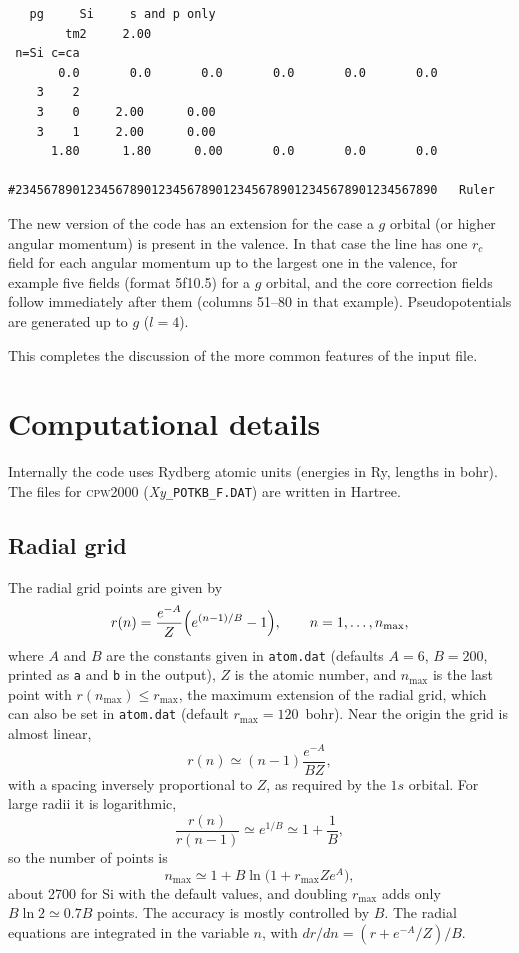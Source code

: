\documentclass[11pt]{article}
\begin{document}
\begin{verbatim}
   pg     Si     s and p only
        tm2     2.00
 n=Si c=ca
       0.0       0.0       0.0       0.0       0.0       0.0
    3    2
    3    0     2.00      0.00
    3    1     2.00      0.00
      1.80      1.80      0.00       0.0       0.0       0.0

#23456789012345678901234567890123456789012345678901234567890   Ruler
\end{verbatim}

The new version of the code has an extension for the case a $g$ orbital
(or higher angular momentum) is present
in the valence.  In that case the line has one $r_c$ field for each angular momentum
up to the largest one in the valence, for example five fields (format 5f10.5) for a $g$
orbital, and the core correction fields follow immediately after them
(columns 51--80 in that example).
Pseudopotentials are generated up to $g$ ($l = 4$).

This completes the discussion of the more common features of the input
file.

\section{Computational details}

Internally the code uses Rydberg atomic units (energies in Ry, lengths in bohr).
The files for \textsc{cpw2000} (\textit{Xy}\texttt{\_POTKB\_F.DAT}) are written in Hartree.

\subsection{Radial grid}
\label{sec:radial}

The radial grid points are given by
\begin{equation}
   r(n) = \frac{e^{-A}}{Z}\Bigl(e^{(n-1)/B}-1\Bigr),\qquad n = 1,\ldots,n_\text{max},
\end{equation}
where $A$ and $B$ are the constants given in \texttt{atom.dat} (defaults $A = 6$, $B = 200$,
printed as \texttt{a} and \texttt{b} in the output),
$Z$ is the atomic number,
and $n_\text{max}$ is the last point with $r(n_\text{max}) \le r_\text{max}$,
the maximum extension of the radial grid, which can also be set in \texttt{atom.dat}
(default $r_\text{max} = 120$~bohr).
Near the origin the grid is almost linear,
\begin{equation}
   r(n) \simeq (n-1)\frac{e^{-A}}{B Z},
\end{equation}
with a spacing inversely proportional to $Z$, as required by the $1s$ orbital.
For large radii it is logarithmic,
\begin{equation}
   \frac{r(n)}{r(n-1)} \simeq e^{1/B} \simeq 1 + \frac{1}{B},
\end{equation}
so the number of points is
\begin{equation}
   n_\text{max} \simeq 1 + B \ln\bigl(1 + r_\text{max} Z e^{A}\bigr),
\end{equation}
about 2700 for Si with the default values, and doubling $r_\text{max}$ adds only $B \ln 2 \simeq 0.7 B$ points.
The accuracy is mostly controlled by $B$.
The radial equations are integrated in the variable $n$,
with $dr/dn = (r + e^{-A}/Z)/B$.
\end{document}
